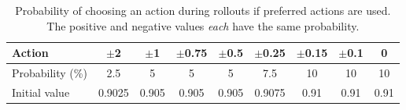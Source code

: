 \begin{table}[htbp]
\footnotesize
\centering
\centerfloat
\begin{tabular}{@{}lcccccccc@{}}
\toprule
Action & $\pm$2 & $\pm$1     & $\pm$0.75  & $\pm$0.5   & $\pm$0.25  & $\pm$0.15  & $\pm$0.1   & 0 \\ \midrule
Probability (\%)  & 2.5   & 5 & 5 & 5 & 7.5   & 10 & 10 & 10 \\ \midrule 
Initial value  & 0.9025 & 0.905 & 0.905 & 0.905 & 0.9075   & 0.91 & 0.91 & 0.91 \\ \bottomrule
\end{tabular}
\caption[Preferred actions probabilities]{Probability of choosing an action during rollouts if preferred actions are used. The positive and negative values \emph{each} have the same probability.}
\label{tab:pref_actions}
\end{table} 